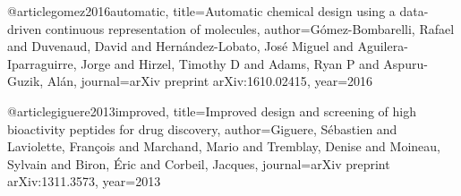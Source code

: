 
@article{gomez2016automatic,
  title={Automatic chemical design using a data-driven continuous representation of molecules},
  author={G{\'o}mez-Bombarelli, Rafael and Duvenaud, David and Hern{\'a}ndez-Lobato, Jos{\'e} Miguel and Aguilera-Iparraguirre, Jorge and Hirzel, Timothy D and Adams, Ryan P and Aspuru-Guzik, Al{\'a}n},
  journal={arXiv preprint arXiv:1610.02415},
  year={2016}
}


@article{giguere2013improved,
  title={Improved design and screening of high bioactivity peptides for drug discovery},
  author={Giguere, S{\'e}bastien and Laviolette, Fran{\c{c}}ois and Marchand, Mario and Tremblay, Denise and Moineau, Sylvain and Biron, {\'E}ric and Corbeil, Jacques},
  journal={arXiv preprint arXiv:1311.3573},
  year={2013}
}


